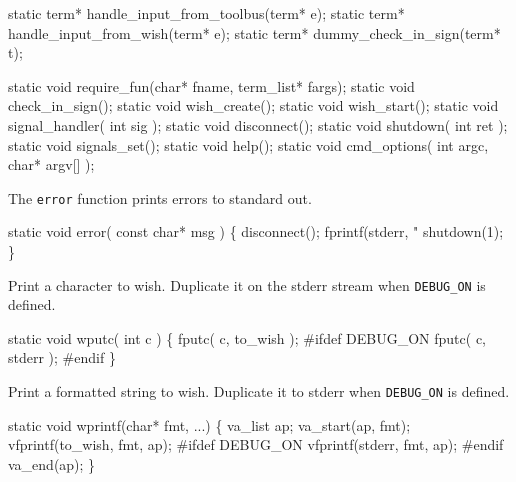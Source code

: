 static term*  handle_input_from_toolbus(term* e);
static term*  handle_input_from_wish(term* e);
static term*  dummy_check_in_sign(term* t);

static void require_fun(char* fname, term_list* fargs);
static void check_in_sign();
static void wish_create();
static void wish_start();
static void signal_handler( int sig );
static void disconnect();
static void shutdown( int ret );
static void signals_set();
static void help();
static void cmd_options( int argc, char* argv[] );
\nwendcode{}\nwdocspar



The {\tt error} function prints errors to standard out.

\nwenddocs{}\endmoddef\let\nwnotused=\nwoutput{}
static void error( const char* msg )
\{
   disconnect();
   fprintf(stderr, "%
   shutdown(1);
\}
\nwendcode{}\nwdocspar


Print a character to wish. Duplicate it on
the stderr stream when {\tt DEBUG_ON} is defined.

\nwenddocs{}\endmoddef\let\nwnotused=\nwoutput{}
static void wputc( int c )
\{
   fputc( c, to_wish );
   #ifdef DEBUG_ON
      fputc( c, stderr );
   #endif
\}
\nwendcode{}\nwdocspar


Print a formatted string to wish. Duplicate it to stderr
when {\tt DEBUG_ON} is defined.

\nwenddocs{}\endmoddef\let\nwnotused=\nwoutput{}
static void wprintf(char* fmt, ...)
\{
  va_list ap;
  va_start(ap, fmt);
  vfprintf(to_wish, fmt, ap);
  #ifdef DEBUG_ON
    vfprintf(stderr, fmt, ap);
  #endif
  va_end(ap);
\}
\nwendcode{}\nwdocspar

